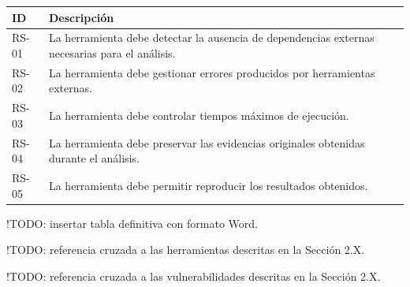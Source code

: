 {\def\LTcaptype{none} %
\begin{longtable}[]{@{}
  >{\raggedright\arraybackslash}p{}
  >{\raggedright\arraybackslash}p{}@{}}
\toprule\noalign{}
\begin{minipage}[b]{\linewidth}\raggedright
ID
\end{minipage} & \begin{minipage}[b]{\linewidth}\raggedright
Descripción
\end{minipage} \\
\midrule\noalign{}
\endhead
\bottomrule\noalign{}
\endlastfoot
RS-01 & La herramienta debe detectar la ausencia de dependencias
externas necesarias para el análisis. \\
RS-02 & La herramienta debe gestionar errores producidos por
herramientas externas. \\
RS-03 & La herramienta debe controlar tiempos máximos de ejecución. \\
RS-04 & La herramienta debe preservar las evidencias originales
obtenidas durante el análisis. \\
RS-05 & La herramienta debe permitir reproducir los resultados
obtenidos. \\
\end{longtable}
}

!TODO: insertar tabla definitiva con formato Word.

!TODO: referencia cruzada a las herramientas descritas en la Sección
2.X.

!TODO: referencia cruzada a las vulnerabilidades descritas en la Sección
2.X.
